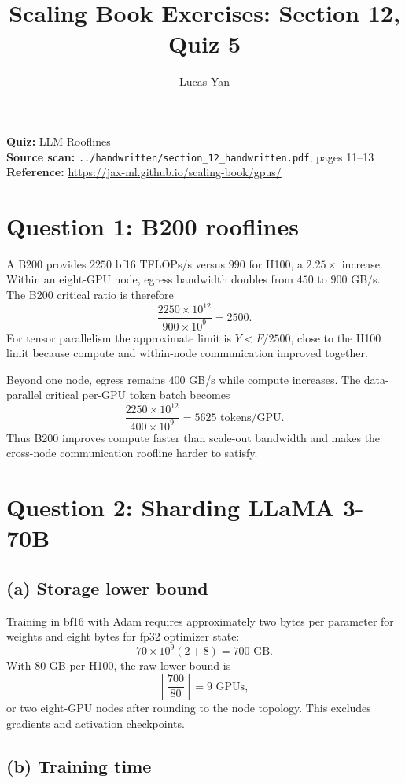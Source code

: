 \documentclass[11pt]{article}
\title{Scaling Book Exercises: Section 12, Quiz 5}
\author{Lucas Yan}
\date{}
\begin{document}
\maketitle

\noindent
\textbf{Quiz:} LLM Rooflines\\
\textbf{Source scan:} \texttt{../handwritten/section\_12\_handwritten.pdf},
pages 11--13\\
\textbf{Reference:} \url{https://jax-ml.github.io/scaling-book/gpus/}

\section*{Question 1: B200 rooflines}

A B200 provides \(2250\) bf16 TFLOPs/s versus \(990\) for H100, a
\(2.25\times\) increase.  Within an eight-GPU node, egress bandwidth doubles
from \(450\) to \(900\) GB/s.  The B200 critical ratio is therefore
\[
\boxed{
\frac{2250\times10^{12}}{900\times10^9}
=2500.}
\]
For tensor parallelism the approximate limit is \(Y<F/2500\), close to the
H100 limit because compute and within-node communication improved together.

Beyond one node, egress remains \(400\) GB/s while compute increases.
The data-parallel critical per-GPU token batch becomes
\[
\boxed{
\frac{2250\times10^{12}}{400\times10^9}
=5625\text{ tokens/GPU}.}
\]
Thus B200 improves compute faster than scale-out bandwidth and makes the
cross-node communication roofline harder to satisfy.

\section*{Question 2: Sharding LLaMA 3-70B}

\subsection*{(a) Storage lower bound}

Training in bf16 with Adam requires approximately two bytes per parameter
for weights and eight bytes for fp32 optimizer state:
\[
70\times10^9(2+8)=\boxed{700\text{ GB}.}
\]
With 80 GB per H100, the raw lower bound is
\[
\left\lceil\frac{700}{80}\right\rceil
=\boxed{9\text{ GPUs}},
\]
or two eight-GPU nodes after rounding to the node topology.  This excludes
gradients and activation checkpoints.

\subsection*{(b) Training time}
\end{document}
